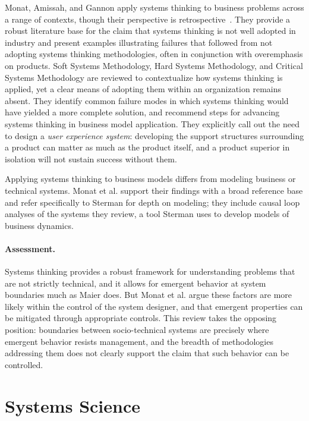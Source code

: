 \documentclass[11pt,a4paper]{article}
\begin{document}
Monat, Amissah, and Gannon apply systems thinking to business problems across a
range of contexts, though their perspective is retrospective~\citep{monat2020}.
They provide a robust literature base for the claim that systems thinking is not
well adopted in industry and present examples illustrating failures that
followed from not adopting systems thinking methodologies, often in conjunction
with overemphasis on products. Soft Systems Methodology, Hard Systems
Methodology, and Critical Systems Methodology are reviewed to contextualize how
systems thinking is applied, yet a clear means of adopting them within an
organization remains absent. They identify common failure modes in which systems
thinking would have yielded a more complete solution, and recommend steps for
advancing systems thinking in business model application. They explicitly call
out the need to design a \emph{user experience system}: developing the support
structures surrounding a product can matter as much as the product itself, and a
product superior in isolation will not sustain success without them.

Applying systems thinking to business models differs from modeling business or
technical systems. Monat et al. support their findings with a broad reference
base and refer specifically to Sterman for depth on modeling; they include
causal loop analyses of the systems they review, a tool Sterman uses to develop
models of business dynamics.

\paragraph{Assessment.} Systems thinking provides a robust framework for
understanding problems that are not strictly technical, and it allows for
emergent behavior at system boundaries much as Maier does. But Monat et al.
argue these factors are more likely within the control of the system designer,
and that emergent properties can be mitigated through appropriate controls. This
review takes the opposing position: boundaries between socio-technical systems
are precisely where emergent behavior resists management, and the breadth of
methodologies addressing them does not clearly support the claim that such
behavior can be controlled.

\section{Systems Science}
\label{sec:ss}
\end{document}
